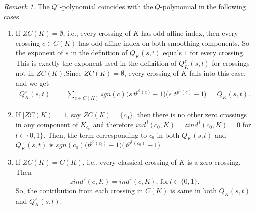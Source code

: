 \documentclass[10pt,a4paper,reqno]{amsart}
\theoremstyle{definition}
\theoremstyle{remark}
\newtheorem{remark}[theorem]{Remark}
\begin{document}
	\begin{remark}
		The $Q^{z}$-polynomial  coincides with the $Q$-polynomial \cite{Naoko2} in the following cases.
		\begin{enumerate}
			\item If $ZC(K) = \emptyset$, i.e., every crossing of $K$ has odd affine index, then every crossing $c \in C(K)$ has odd affine index on both smoothing components. So the exponent of $s$ in the definition of $Q_{K}(s,t)$ equals $1$ for every crossing. This is exactly the exponent used in the definition of $Q^{z}_{K}(s,t)$ for crossings not in $ZC(K)$.Since $ZC(K)=\emptyset$, every crossing of $K$ falls into this case, and we get
				\begin{align*}
				Q^{z}_{K}(s,t) 
				=\,& \sum_{c \in C(K)} 
				sgn(c)\bigl(s\,t^{p^{0}(c)}-1\bigr)
				\bigl(s\,\,t^{p^{1}(c)}-1\bigr)
				=\, Q_{K}(s,t).
			\end{align*}
				\item If $|ZC(K)| = 1$, say $ZC(K) = \{c_0\}$, then there is no other zero crossings in any component of $K_{c_0}$ and therefore
			$ind^{\,l}(c_{0},K)= zind^{\,l}(c_{0},K)=0$ for $ l\in \{0,1\}$. Then, the term corresponding to $c_0$ in both $Q_{K}(s,t)$ and $Q_{K}^{z}(s,t)$ is	$sgn(c_{0})\bigl(t^{p^{0}(c_{0})}-1\bigr)
			\bigl(\,t^{p^{1}(c_{0})}-1\bigr)$.
			\item If $ZC(K) = C(K)$, i.e., every classical crossing of $K$ is a 
			zero crossing. Then \[zind^{\,l}(c,K)= ind^{\,l}(c,K),\, \text{for}\, l\in \{0,1\}.\] So, the contribution from each crossing in $C(K)$ is same in both $Q_{K}(s,t)$ and $Q^{z}_{K}(s,t)$.
		
		\end{enumerate}
	\end{remark}
\end{document}
